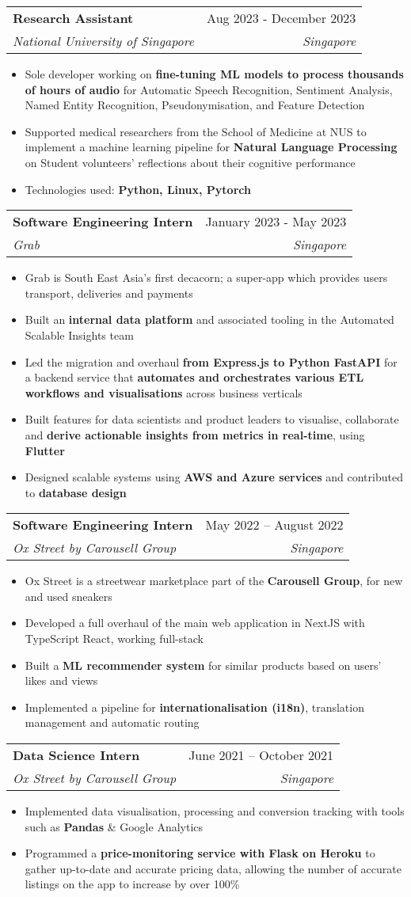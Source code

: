 \documentclass[letterpaper,11pt]{article}
\makeatletter
\newcommand{\resumeItem}[1]{
  \item\small{
    {#1 \vspace{-2pt}}
  }
}
\newcommand{\resumeSubheading}[4]{
  \vspace{-2pt}\item
    \begin{tabular*}{0.97\textwidth}[t]{l@{\extracolsep{\fill}}r}
      \textbf{#1} & #2 \\
      \textit{\small#3} & \textit{\small #4} \\
    \end{tabular*}\vspace{-7pt}
}
\newcommand{\resumeItemListStart}{\begin{itemize}}
\newcommand{\resumeItemListEnd}{\end{itemize}\vspace{-5pt}}
\makeatother
\begin{document}
    \resumeSubheading
    {Research Assistant}{Aug 2023 - December 2023}
    {National University of Singapore}{Singapore}
    \resumeItemListStart
    \resumeItem{Sole developer working on \textbf{fine-tuning ML models to process thousands of hours of audio} for Automatic Speech Recognition, Sentiment Analysis, Named Entity Recognition, Pseudonymisation, and Feature Detection}
    \resumeItem{Supported medical researchers from the School of Medicine at NUS to implement a machine learning pipeline for \textbf{Natural Language Processing} on Student volunteers' reflections about their cognitive performance}
    \resumeItem{Technologies used: \textbf{Python, Linux, Pytorch}}
    \resumeItemListEnd

    \resumeSubheading
    {Software Engineering Intern}{January 2023 - May 2023}
    {Grab}{Singapore}
    \resumeItemListStart
    \resumeItem{Grab is South East Asia's first decacorn; a super-app which provides users transport, deliveries and payments}
    \resumeItem{Built an \textbf{internal data platform} and associated tooling in the Automated Scalable Insights team}
    \resumeItem{Led the migration and overhaul \textbf{from Express.js to Python FastAPI} for a backend service that \textbf{automates and orchestrates various ETL workflows and visualisations} across business verticals}
    \resumeItem{Built features for data scientists and product leaders to visualise, collaborate and \textbf{derive actionable insights from metrics in real-time}, using \textbf{Flutter}}
    \resumeItem{Designed scalable systems using \textbf{AWS and Azure services} and contributed to \textbf{database design}}
    \resumeItemListEnd

    \resumeSubheading
      {Software Engineering Intern}{May 2022 -- August 2022}
      {Ox Street by Carousell Group}{Singapore}
      \resumeItemListStart
        \resumeItem{Ox Street is a streetwear marketplace part of the \textbf{Carousell Group}, for new and used sneakers}
        \resumeItem{Developed a full overhaul of the main web application in NextJS with TypeScript React, working full-stack}
        \resumeItem{Built a \textbf{ML recommender system} for similar products based on users' likes and views}
        \resumeItem{Implemented a pipeline for \textbf{internationalisation (i18n)}, translation management and automatic routing}
      \resumeItemListEnd

      \resumeSubheading
      {Data Science Intern}{June 2021 -- October 2021}
      {Ox Street by Carousell Group}{Singapore}
      \resumeItemListStart
        \resumeItem{Implemented data visualisation, processing and conversion tracking with tools such as \textbf{Pandas} \& Google Analytics}
        \resumeItem{Programmed a \textbf{price-monitoring service with Flask on Heroku} to gather up-to-date and accurate pricing data, allowing the number of accurate listings on the app to increase by over 100\%}
      \resumeItemListEnd
\end{document}
